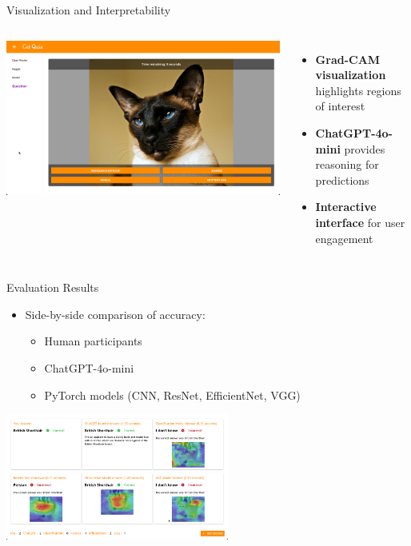 \documentclass{beamer}
\begin{document}
\begin{frame}{Visualization and Interpretability}
    \begin{columns}[T]
        \includegraphics[width=\textwidth]{quiz.png}
        
        \begin{itemize}
            \item \textbf{Grad-CAM visualization} highlights regions of interest
            \item \textbf{ChatGPT-4o-mini} provides reasoning for predictions
            \item \textbf{Interactive interface} for user engagement
        \end{itemize}
    \end{columns}
\end{frame}

\begin{frame}{Evaluation Results}

    \begin{itemize}
        \item Side-by-side comparison of accuracy:
        \begin{itemize}
            \item Human participants
            \item ChatGPT-4o-mini
            \item PyTorch models (CNN, ResNet, EfficientNet, VGG)
        \end{itemize}
    \end{itemize}    
    \begin{center}
        \includegraphics[width=0.55\textwidth]{evaluation.png}
    \end{center}
\end{frame}
\end{document}
